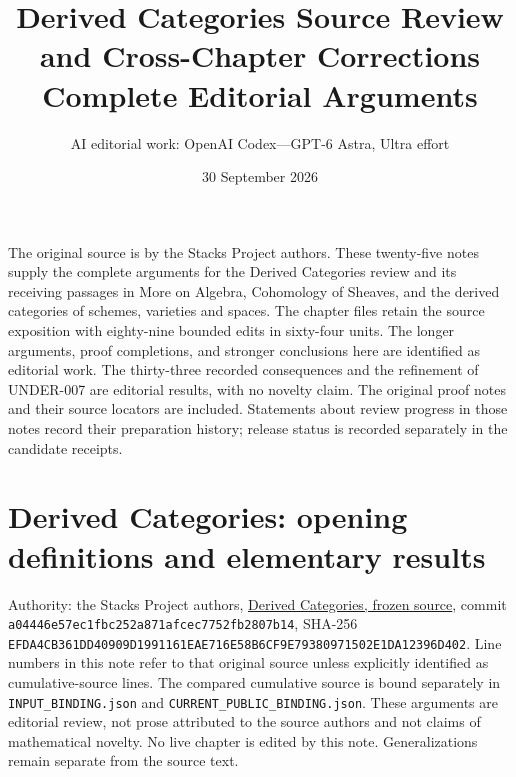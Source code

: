 \documentclass[11pt]{article}
\title{Derived Categories Source Review and Cross-Chapter Corrections\\Complete Editorial Arguments}
\author{AI editorial work: OpenAI Codex---GPT-6 Astra, Ultra effort}
\date{30 September 2026}
\begin{document}
\maketitle
\noindent
The original source is by the Stacks Project authors. These twenty-five notes
supply the complete arguments for the Derived Categories review and its
receiving passages in More on Algebra, Cohomology of Sheaves, and the
derived categories of schemes, varieties and spaces. The chapter files
retain the source exposition with eighty-nine bounded edits in sixty-four units. The longer arguments, proof
completions, and stronger conclusions here are identified as editorial
work. The thirty-three recorded consequences and the refinement of UNDER-007
are editorial results, with no novelty claim.
The original proof notes and their source locators are included. Statements
about review progress in those notes record their preparation history;
release status is recorded separately in the candidate receipts.
\setcounter{secnumdepth}{1}
\makeatletter
\renewcommand\@pnumwidth{2.5em}
\renewcommand\@tocrmarg{3.5em}
\makeatother
\tableofcontents\clearpage
\section{\texorpdfstring{Derived Categories:\allowbreak{} opening definitions and elementary results}{Derived  opening definitions and elementary results}}\label{proofs-0001-1140-derived-categories-opening-definitions-and-elementary-results}

Authority:\allowbreak{} the Stacks Project authors,\allowbreak{} \href{https://github.com/stacks/stacks-project/blob/a04446e57ec1fbc252a871afcec7752fb2807b14/derived.tex}{Derived Categories,\allowbreak{} frozen source},\allowbreak{} commit \texttt{a04446e5\allowbreak{}7ec1fbc2\allowbreak{}52a871af\allowbreak{}cec7752f\allowbreak{}b2807b14},\allowbreak{} SHA-256 \texttt{EFDA4CB3\allowbreak{}61DD4090\allowbreak{}9D199116\allowbreak{}1EAE716E\allowbreak{}58B6CF9E\allowbreak{}79380971\allowbreak{}502E1DA1\allowbreak{}2396D402}. Line numbers in this note refer to that original source unless explicitly identified as cumulative-source lines. The compared cumulative source is bound separately in \texttt{INPUT\_\allowbreak{}BINDING.\allowbreak{}json} and \texttt{CURRENT\_\allowbreak{}PUBLIC\_\allowbreak{}BINDING.\allowbreak{}json}. These arguments are editorial review,\allowbreak{} not prose attributed to the source authors and not claims of mathematical novelty. No live chapter is edited by this note. Generalizations remain separate from the source text.
\end{document}
